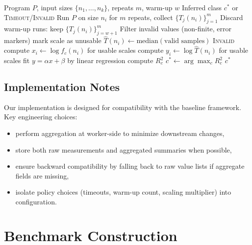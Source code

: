 \documentclass[conference]{IEEEtran}
\begin{document}
\begin{algorithm}[t]
\caption{Robust Empirical Complexity Inference}
\label{alg:pipeline}
\begin{algorithmic}[1]
\Require Program $P$, input sizes $\{n_1,\dots,n_k\}$, repeats $m$, warm-up $w$
\Ensure Inferred class $c^*$ or \textsc{Timeout}/\textsc{Invalid}
  \State Run $P$ on size $n_i$ for $m$ repeats, collect $\{T_j(n_i)\}_{j=1}^m$
  \State Discard warm-up runs: keep $\{T_j(n_i)\}_{j=w+1}^m$
  \State Filter invalid values (non-finite, error markers)
    \State mark scale as unusable
  \Else
    \State $\hat{T}(n_i) \gets \mathrm{median}(\text{valid samples})$
  \EndIf
\EndFor
{}
  \State \Return \textsc{Invalid}
\EndIf
{}
  \State compute $x_i \gets \log f_c(n_i)$ for usable scales
  \State compute $y_i \gets \log \hat{T}(n_i)$ for usable scales
  \State fit $y = \alpha x + \beta$ by linear regression
  \State compute $R^2_c$
\EndFor
\State $c^* \gets \arg\max_c R^2_c$
\State \Return $c^*$
\end{algorithmic}
\end{algorithm}

\subsection{Implementation Notes}

Our implementation is designed for compatibility with the baseline framework.
Key engineering choices:
\begin{itemize}[leftmargin=1.2em]
\item perform aggregation at worker-side to minimize downstream changes,
\item store both raw measurements and aggregated summaries when possible,
\item ensure backward compatibility by falling back to raw value lists if
aggregate fields are missing,
\item isolate policy choices (timeouts, warm-up count, scaling multiplier) into
configuration.
\end{itemize}

\section{Benchmark Construction}
\label{sec:dataset}
\end{document}
